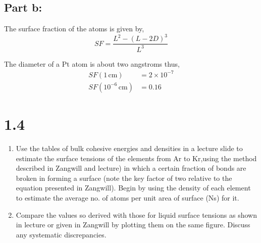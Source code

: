 \documentclass[12pt]{article}
\renewcommand{\=}[1]{\stackrel{#1}{=}} %
\theoremstyle{definition}
\theoremstyle{remark}
\begin{document}
\subsection*{Part b:}

The surface fraction of the atoms is given by,
\[
SF = \dfrac{L^2 - (L-2D)^3}{L^3} 
\]

The diameter of a Pt atom is about two angstroms thus,
\begin{align*}
SF(1\,\text{cm}) &= 2\times 10^{-7}\\[3mm]
SF(10^{-6}\,\text{cm}) &= 0.16
\end{align*}


\newpage
\section*{1.4}
\begin{bclogo}[logo=\bcquestion , barre=none]
\newline
\begin{enumerate}
\item Use the tables of bulk cohesive energies and densities in a lecture slide to estimate the surface tensions of the elements from Ar to Kr,using the method described in Zangwill and lecture) in which a certain fraction of bonds are broken in forming a surface (note the key factor of two relative to the equation presented in Zangwill). Begin by using the density of each element to estimate the average no. of atoms per unit area of surface (Ns) for it.

\item Compare the values so derived with those for liquid surface tensions as shown in lecture or given in Zangwill by plotting them on the same figure. Discuss any systematic discrepancies.
\end{enumerate}

\end{bclogo}
\vspace{2cm}





\newpage
\end{document}
